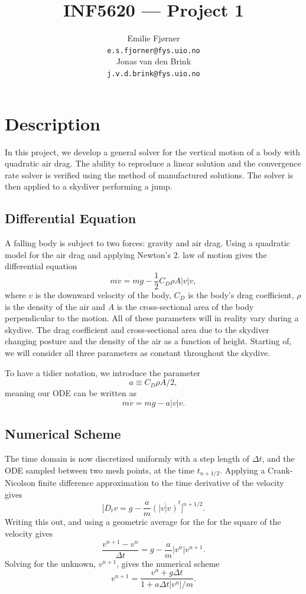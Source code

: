 \documentclass[a4paper, 11pt, notitlepage, english]{article}
\author{Emilie Fjørner \\[-0.4cm] \texttt{e.s.fjorner@fys.uio.no} \\[0.2cm] Jonas van den Brink \\[-0.4cm] \texttt{j.v.d.brink@fys.uio.no}}
\title{INF5620 --- Project 1}
\begin{document}
\maketitle


\section*{Description}

In this project, we develop a general solver for the vertical motion of a body with quadratic air drag. The ability to reproduce a linear solution and the convergence rate solver is 
verified using the method of manufactured solutions. The solver is then applied to a skydiver performing a jump.


\subsection*{Differential Equation}
A falling body is subject to two forces: gravity and air drag. Using a quadratic model for the air drag and applying Newton's 2. law of motion gives the differen\-tial equation
$$m\dot{v} = mg - \frac{1}{2}C_D \rho A |v| v,$$
where $v$ is the downward velocity of the body, $C_D$ is the body's drag coefficient, $\rho$ is the density of the air and $A$ is the cross-sectional area of the body 
perpendicular to the motion. All of these parameters will in reality vary during a skydive. The drag coefficient and cross-sectional area due to the skydiver changing 
posture and the density of the air as a function of height. Starting of, we will consider all three parameters as constant throughout the skydive.

To have a tidier notation, we introduce the parameter 
$$a \equiv C_D \rho A /2,$$
meaning our ODE can be written as
$$m\dot{v} = mg - a |v| v.$$


\subsection*{Numerical Scheme}
The time domain is now discretized uniformly with a step length of $\Delta t$, and the ODE sampled between two mesh points, at the time $t_{n+1/2}$. 
Applying a Crank-Nicolson finite difference approximation to the time derivative of the velocity gives
$$\big[D_t v = g - \frac{a}{m} \overline{(|v|v)}^t\big]^{n+1/2}.$$
Writing this out, and using a geometric average for the for the square of the velocity gives
$$\frac{v^{n+1} - v^n}{\Delta t} = g - \frac{a}{m}|v^n| v^{n+1}.$$
Solving for the unknown, $v^{n+1}$, gives the numerical scheme
$$v^{n+1} = \frac{v^n + g \Delta t}{1 + a \Delta t |v^n|/m}.$$
\end{document}
